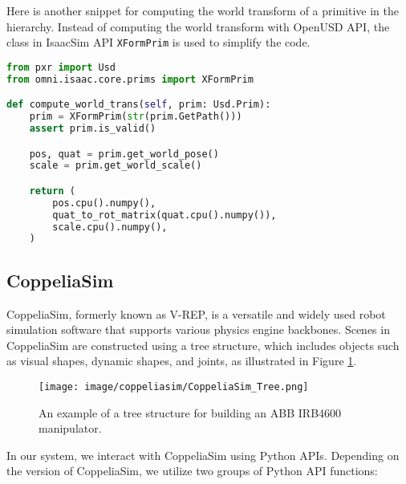 Here is another snippet for computing the world transform of a primitive in the hierarchy. Instead of computing the world transform with OpenUSD API, the class in IsaacSim API \texttt{XFormPrim} is used to simplify the code.

\begin{lstlisting}[language=Python]
from pxr import Usd
from omni.isaac.core.prims import XFormPrim

def compute_world_trans(self, prim: Usd.Prim):
    prim = XFormPrim(str(prim.GetPath()))
    assert prim.is_valid()

    pos, quat = prim.get_world_pose()
    scale = prim.get_world_scale()

    return (
        pos.cpu().numpy(),
        quat_to_rot_matrix(quat.cpu().numpy()),
        scale.cpu().numpy(),
    )
\end{lstlisting}

\subsection{CoppeliaSim}
CoppeliaSim, formerly known as V-REP, is a versatile and widely used robot simulation software that supports various physics engine backbones. Scenes in CoppeliaSim are constructed using a tree structure, which includes objects such as visual shapes, dynamic shapes, and joints, as illustrated in Figure \ref{fig:coppliasim-tree}.

\begin{figure}[h]
    \centering
    \texttt{[image: image/coppeliasim/CoppeliaSim\_Tree.png]}
    \caption{An example of a tree structure for building an ABB IRB4600 manipulator.}
    \label{fig:coppliasim-tree}
\end{figure}

In our system, we interact with CoppeliaSim using Python APIs. Depending on the version of CoppeliaSim, we utilize two groups of Python API functions:

